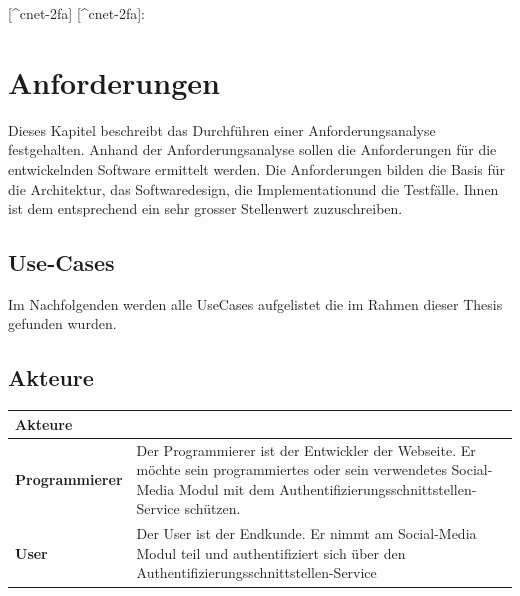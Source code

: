 {[}\^{}cnet-2fa{]} {[}\^{}cnet-2fa{]}: \autocite{cnet-2fa}

\chapter{Anforderungen}\label{anforderungen}

Dieses Kapitel beschreibt das Durchführen einer Anforderungsanalyse
festgehalten. Anhand der Anforderungsanalyse sollen die Anforderungen
für die entwickelnden Software ermittelt werden. Die Anforderungen
bilden die Basis für die Architektur, das Softwaredesign, die
Implementationund die Testfälle. Ihnen ist dem entsprechend ein sehr
grosser Stellenwert zuzuschreiben.

\section{Use-Cases}\label{use-cases}

Im Nachfolgenden werden alle UseCases aufgelistet die im Rahmen dieser
Thesis gefunden wurden.

\section{Akteure}\label{akteure}

\begin{longtable}[c]{@{}ll@{}}
\toprule
\begin{minipage}[b]{0.34\columnwidth}\raggedright\strut
\textbf{Akteure}
\strut\end{minipage} &
\begin{minipage}[b]{0.60\columnwidth}\raggedright\strut
\strut\end{minipage}\tabularnewline
\midrule
\endhead
\begin{minipage}[t]{0.34\columnwidth}\raggedright\strut
\textbf{Programmierer}
\strut\end{minipage} &
\begin{minipage}[t]{0.60\columnwidth}\raggedright\strut
Der Programmierer ist der Entwickler der Webseite. Er möchte sein
programmiertes oder sein verwendetes Social-Media Modul mit dem
Authentifizierungsschnittstellen-Service schützen.
\strut\end{minipage}\tabularnewline
\begin{minipage}[t]{0.34\columnwidth}\raggedright\strut
\textbf{User}
\strut\end{minipage} &
\begin{minipage}[t]{0.60\columnwidth}\raggedright\strut
Der User ist der Endkunde. Er nimmt am Social-Media Modul teil und
authentifiziert sich über den Authentifizierungsschnittstellen-Service
\strut\end{minipage}\tabularnewline
\bottomrule
\end{longtable}

